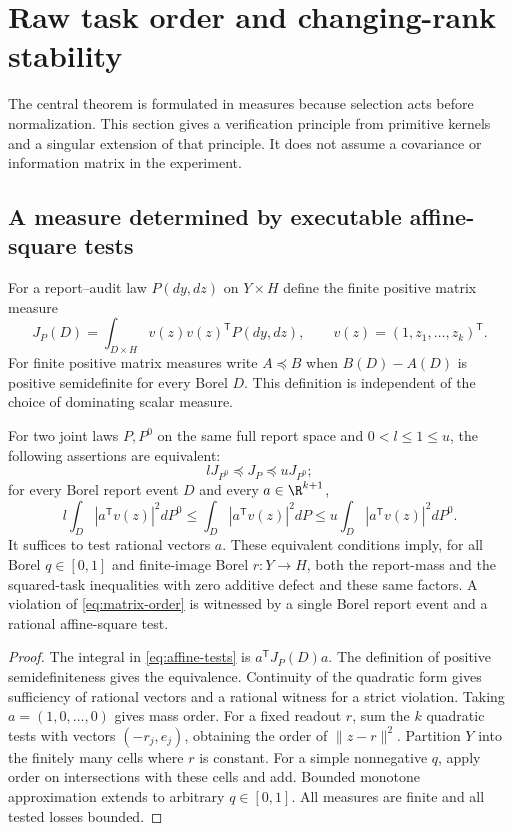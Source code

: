\section{Raw task order and changing-rank stability}\label{sec:order}
The central theorem is formulated in measures because selection acts before normalization. This section gives a verification principle from primitive kernels and a singular extension of that principle. It does not assume a covariance or information matrix in the experiment.

\subsection*{A measure determined by executable affine-square tests}
For a report--audit law $P(dy,dz)$ on $Y\times H$ define the finite positive matrix measure
\begin{equation}\label{eq:moment-matrix}
 J_P(D)=\int_{D\times H}v(z)v(z)^\mathsf T P(dy,dz),
 \qquad v(z)=(1,z_1,\ldots,z_k)^\mathsf T.
\end{equation}
For finite positive matrix measures write $A\preccurlyeq B$ when $B(D)-A(D)$ is positive semidefinite for every Borel $D$. This definition is independent of the choice of dominating scalar measure.

\begin{proposition}\label{prop:matrix-order}
For two joint laws $P,P^0$ on the same full report space and $0<l\le1\le u$, the following assertions are equivalent:
\begin{equation}\label{eq:matrix-order}
 lJ_{P^0}\preccurlyeq J_P\preccurlyeq uJ_{P^0};
\end{equation}
for every Borel report event $D$ and every $a\in\R^{k+1}$,
\begin{equation}\label{eq:affine-tests}
 l\int_D|a^\mathsf T v(z)|^2dP^0
 \le\int_D|a^\mathsf T v(z)|^2dP
 \le u\int_D|a^\mathsf T v(z)|^2dP^0.
\end{equation}
It suffices to test rational vectors $a$. These equivalent conditions imply, for all Borel $q\in[0,1]$ and finite-image Borel $r:Y\to H$, both the report-mass and the squared-task inequalities with zero additive defect and these same factors. A violation of \eqref{eq:matrix-order} is witnessed by a single Borel report event and a rational affine-square test.
\end{proposition}
\begin{proof}
The integral in \eqref{eq:affine-tests} is $a^\mathsf T J_P(D)a$. The definition of positive semidefiniteness gives the equivalence. Continuity of the quadratic form gives sufficiency of rational vectors and a rational witness for a strict violation. Taking $a=(1,0,\ldots,0)$ gives mass order. For a fixed readout $r$, sum the $k$ quadratic tests with vectors $(-r_j,e_j)$, obtaining the order of $\|z-r\|^2$. Partition $Y$ into the finitely many cells where $r$ is constant. For a simple nonnegative $q$, apply order on intersections with these cells and add. Bounded monotone approximation extends to arbitrary $q\in[0,1]$. All measures are finite and all tested losses bounded.
\end{proof}

